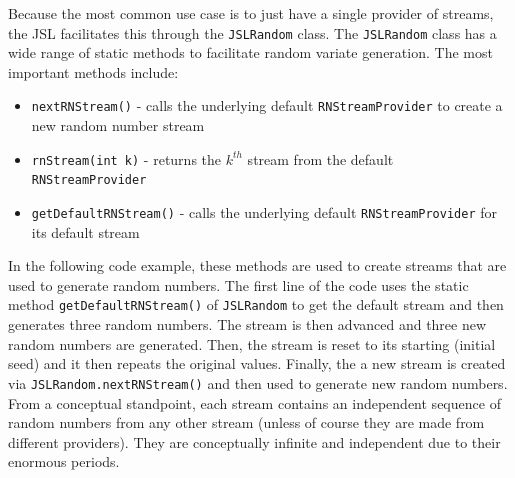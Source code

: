 \documentclass[
]{book}
\providecommand{\tightlist}{%
  \setlength{\itemsep}{0pt}\setlength{\parskip}{0pt}}
\theoremstyle{definition}
\theoremstyle{definition}
\theoremstyle{definition}
\theoremstyle{definition}
\theoremstyle{remark}
\begin{document}
Because the most common use case is to just have a single provider of streams, the JSL facilitates this through the \texttt{JSLRandom} class. The \texttt{JSLRandom} class has a wide range of static methods to facilitate random variate generation.
The most important methods include:

\begin{itemize}
\tightlist
\item
  \texttt{nextRNStream()} - calls the underlying default \texttt{RNStreamProvider} to create a new random number stream
\item
  \texttt{rnStream(int\ k)} - returns the \(k^{th}\) stream from the default \texttt{RNStreamProvider}
\item
  \texttt{getDefaultRNStream()} - calls the underlying default \texttt{RNStreamProvider} for its default stream
\end{itemize}

In the following code example, these methods are used to create streams that are used to generate random numbers.
The first line of the code uses the static method \texttt{getDefaultRNStream()} of \texttt{JSLRandom} to get the default stream and
then generates three random numbers. The stream is then advanced and three new random numbers are generated. Then,
the stream is reset to its starting (initial seed) and it then repeats the original values. Finally, the a new stream
is created via \texttt{JSLRandom.nextRNStream()} and then used to generate new random numbers. From a conceptual standpoint,
each stream contains an independent sequence of random numbers from any other stream (unless of course they are made from different providers). They are conceptually infinite and independent due to their enormous periods.
\end{document}
